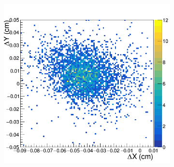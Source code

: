 \begin{figure}[h!]
\centering
 \begin{subfigure}[l]{.45\textwidth}
   \centering
   \includegraphics[width=\linewidth]{thesis_figures/alignment/Run_3211_before/square/GEM1.png}


\end{subfigure}
\end{figure}
